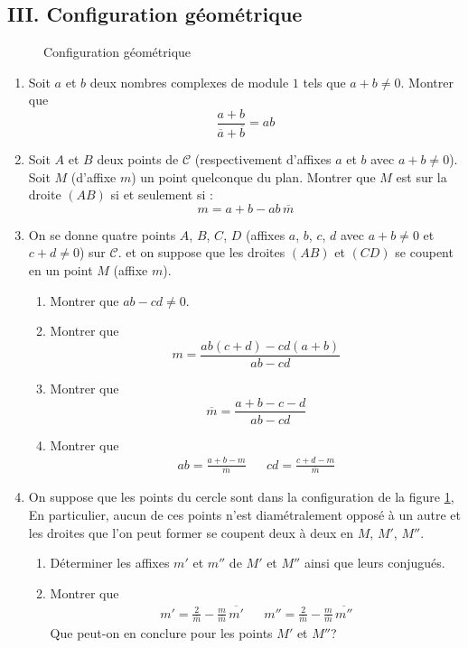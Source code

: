 \subsection*{III. Configuration géométrique}
\begin{figure}[ht]
 \centering
 
 \caption{Configuration géométrique}
 \label{fig:Edtepol_1}
\end{figure}
\begin{enumerate}
 \item Soit $a$ et $b$ deux nombres complexes de module $1$ tels que $a+b\neq 0$. Montrer que
\begin{displaymath}
 \frac{a + b}{\overline{a} + \overline{b}} = ab
\end{displaymath}
\item Soit $A$ et $B$ deux points de $\mathcal C$ (respectivement d'affixes $a$ et $b$ avec $a+b\neq 0$). Soit $M$ (d'affixe $m$) un point quelconque du plan. Montrer que $M$ est sur la droite $(AB)$ si et seulement si :
\begin{displaymath}
 m = a+b -ab \,\overline{m}
\end{displaymath}
\item On se donne quatre points $A$, $B$, $C$, $D$ (affixes $a$, $b$, $c$, $d$ avec $a+b\neq 0$ et $c+d\neq 0$) sur $\mathcal C$.  et on suppose que les droites $(AB)$ et $(CD)$ se coupent en un point $M$ (affixe $m$).
\begin{enumerate}
 \item Montrer que $ab-cd\neq 0$.
 \item Montrer que 
\begin{displaymath}
 m = \frac{ab(c+d)-cd(a+b)}{ab - cd}
\end{displaymath}
\item Montrer que
\begin{displaymath}
 \overline{m} = \frac{a + b - c - d}{ab -cd}
\end{displaymath}
\item Montrer que 
\begin{align*}
 ab=\frac{a + b -m}{\overline{m}} & & cd=\frac{c + d -m}{\overline{m}} 
\end{align*}

\end{enumerate}
\item On suppose que les points du cercle sont dans la configuration de la figure \ref{fig:Edtepol_1}, En particulier, aucun de ces points n'est diamétralement opposé à un autre et les droites que l'on peut former se coupent deux à deux en $M$, $M'$, $M''$.
\begin{enumerate}
 \item Déterminer les affixes $m'$ et $m''$ de $M'$ et $M''$ ainsi que leurs conjugués.
 \item Montrer que 
\begin{align*}
 m' = \frac{2}{\overline{m}} - \frac{m}{\overline{m}}\, \overline{m'}
& &
 m'' = \frac{2}{\overline{m}} - \frac{m}{\overline{m}}\, \overline{m''}
\end{align*}
Que peut-on en conclure pour les points $M'$ et $M''$?
\end{enumerate}

\end{enumerate}
